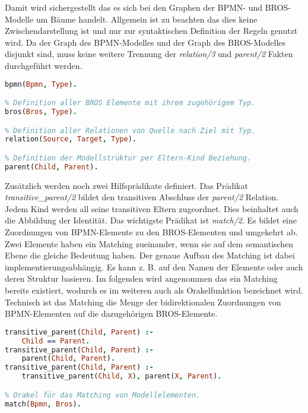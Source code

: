 Damit wird sichergestellt das es sich bei den Graphen der BPMN- und BROS-Modelle um Bäume handelt.
Allgemein ist zu beachten das dies keine Zwischendarstellung ist und nur zur syntaktischen Definition der Regeln genutzt wird.
Da der Graph des BPMN-Modelles und der Graph des BROS-Modelles disjunkt sind, muss keine weitere Trennung der \emph{relation/3} und \emph{parent/2} Fakten durchgeführt werden.

\begin{lstlisting}[language=Prolog, caption=Definitionen der Faktenbasis, label=lst:definition_facts]
% Definition aller BPMN Elemente mit ihrem zugehörigem Typ.
bpmn(Bpmn, Type).

% Definition aller BROS Elemente mit ihrem zugehörigem Typ.
bros(Bros, Type).

% Definition aller Relationen von Quelle nach Ziel mit Typ.
relation(Source, Target, Type).

% Definition der Modellstruktur per Eltern-Kind Beziehung.
parent(Child, Parent).
\end{lstlisting}

Zusätzlich werden noch zwei Hilfsprädikate definiert.
Das Prädikat \emph{transitive\_parent/2} bildet den transitiven Abschluss der \emph{parent/2} Relation.
Jedem Kind werden all seine transitiven Eltern zugeordnet.
Dies beinhaltet auch die Abbildung der Identität.
Das wichtigste Prädikat ist \emph{match/2}.
Es bildet eine Zuordnungen von BPMN-Elemente zu den BROS-Elementen und umgekehrt ab.
Zwei Elemente haben ein Matching zueinander, wenn sie auf dem semantischen Ebene die gleiche Bedeutung haben.
Der genaue Aufbau des Matching ist dabei implementierungsabhängig.
Es kann z. B. auf den Namen der Elemente oder auch deren Struktur basieren.
Im folgenden wird angenommen das ein Matching bereits existiert, wodurch es im weiteren auch als Orakelfunktion bezeichnet wird.
Technisch ist das Matching die Menge der bidirektionalen Zuordnungen von BPMN-Elementen auf die dazugehörigen BROS-Elemente. 

\begin{lstlisting}[language=Prolog, caption=Definitionen der weiterführenden Regeln, label=lst:definition_predicats]
% Transitiver Abschluss der Modellstruktur.
transitive_parent(Child, Parent) :- 
    Child == Parent.
transitive_parent(Child, Parent) :- 
    parent(Child, Parent).
transitive_parent(Child, Parent) :- 
    transitive_parent(Child, X), parent(X, Parent).

% Orakel für das Matching von Modellelementen.
match(Bpmn, Bros).
\end{lstlisting}

